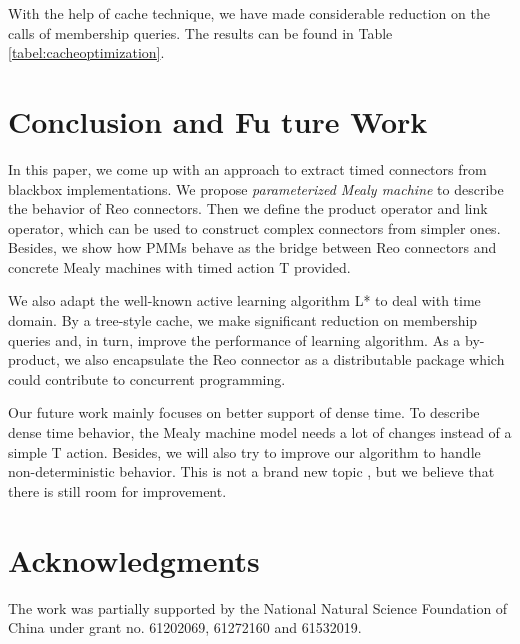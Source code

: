 \documentclass[conference, a4paper]{IEEEtran}
\begin{document}
With the help of cache technique, we have made considerable reduction on the calls of membership queries. The results
can be found in Table \ref{tabel:cacheoptimization}.

\section{Conclusion and Fu ture Work}
In this paper, we come up with an approach to extract timed connectors from blackbox
implementations. We propose \emph{parameterized Mealy machine} to describe the behavior of Reo
connectors. Then we define the product operator and link operator, which can be used to
construct complex connectors from simpler ones.
Besides, we show how PMMs behave as the bridge between Reo connectors and concrete Mealy
machines with timed action T provided. 

We also adapt the well-known active learning algorithm L* to deal with time domain.
By a tree-style cache, we make significant reduction on membership queries and, in turn,
improve the performance of learning algorithm. As a by-product, we also encapsulate the Reo
connector as a distributable package which could contribute to concurrent programming.

Our future work mainly focuses on better support of dense time. To describe dense
time behavior, the Mealy machine model needs a lot of changes instead of a simple T action. Besides,
we will also try to improve our algorithm to handle non-deterministic behavior. This is not a brand
new topic \cite{DBLP:conf/isola/VolpatoT14}, but we believe that there is still room for
improvement.  

\section*{Acknowledgments}
The work was partially supported by the National Natural Science Foundation of China under grant no.
61202069, 61272160 and 61532019.


\end{document}
